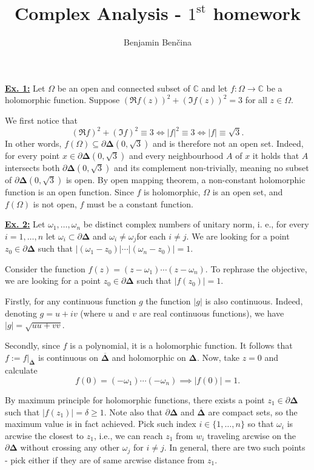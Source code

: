 \documentclass[a4paper, 12pt]{article} %
\title{Complex Analysis - $1^{\text{st}}$ homework}
\author{Benjamin Benčina}
\newcommand{\C}{\mathbb{C}}
\newcommand{\closure}[1]{\overline{#1}}
\begin{document}
\maketitle

\underline{\textbf{Ex. 1:}}
Let $\Omega$ be an open and connected subset of $\C$ and let $f\colon\Omega\to\C$ be a holomorphic function. Suppose $(\Re f(z))^2 + (\Im f(z))^2 = 3$ for all $z \in \Omega$.

We first notice that
\[
(\Re f)^2 + (\Im f)^2 \equiv 3 \iff |f|^2 \equiv 3 \iff |f| \equiv \sqrt{3}.
\]
In other words, $f(\Omega) \subseteq \partial\mathbf{\Delta}(0, \sqrt{3})$ and is therefore not an open set. Indeed, for every point $x \in \partial\mathbf{\Delta}(0, \sqrt{3})$ and every neighbourhood $A$ of $x$ it holds that $A$ intersects both $\partial\mathbf{\Delta}(0, \sqrt{3})$ and its complement non-trivially, meaning no subset of $\partial\mathbf{\Delta}(0, \sqrt{3})$ is open. By open mapping theorem, a non-constant holomorphic function is an open function. Since $f$ is holomorphic, $\Omega$ is an open set, and $f(\Omega)$ is not open, $f$ must be a constant function.
\newline

\underline{\textbf{Ex. 2:}}
Let $\omega_1,\dots, \omega_n$ be distinct complex numbers of unitary norm, i. e., for every $i = 1, \dots, n$ let $\omega_i \subset \partial\mathbf{\Delta}$ and  $\omega_i \neq \omega_j$for each $i \neq j$. We are looking for a point $z_0 \in \partial\mathbf{\Delta}$ such that $|(\omega_1 - z_0)|\cdots|(\omega_n - z_0)| = 1$.

Consider the function $f(z) = (z - \omega_1)\cdots(z - \omega_n)$. To rephrase the objective, we are looking for a point $z_0 \in \partial\mathbf{\Delta}$ such that $|f(z_0)| = 1$.

Firstly, for any continuous function $g$ the function $|g|$ is also continuous. Indeed, denoting $g = u + iv$ (where $u$ and $v$ are real continuous functions), we have $|g| = \sqrt{u u + v v}$.

Secondly, since $f$ is a polynomial, it is a holomorphic function. It follows that $f := f|_{\closure{\mathbf{\Delta}}}$ is continuous on $\closure{\mathbf{\Delta}}$ and holomorphic on $\mathbf{\Delta}$. Now, take $z = 0$ and calculate
\[
f(0) = (-\omega_1)\cdots(-\omega_n) \implies |f(0)| = 1.
\]

By maximum principle for holomorphic functions, there exists a point $z_1 \in \partial\mathbf{\Delta}$ such that $|f(z_1)| = \delta \geq 1$. Note also that $\partial\mathbf{\Delta}$ and $\closure{\mathbf{\Delta}}$ are compact sets, so the maximum value is in fact achieved. Pick such index $i \in \lbrace 1, \dots, n\rbrace$ so that $\omega_i$ is arcwise the closest to $z_1$, i.e., we can reach $z_1$ from $w_i$ traveling arcwise on the $\partial\mathbf{\Delta}$ without crossing any other $\omega_j$ for $i \neq j$. In general, there are two such points - pick either if they are of same arcwise distance from $z_1$.
\end{document}
